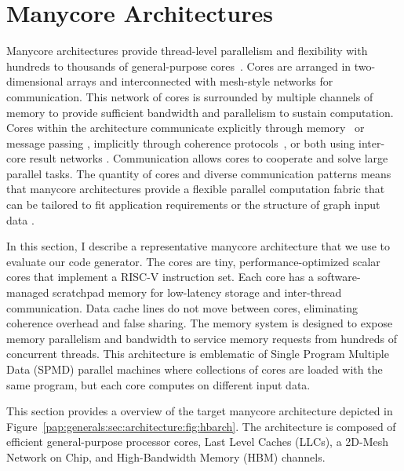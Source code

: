 
\section{Manycore Architectures} \label{pap:generals:sec:architecture}
Manycore architectures provide thread-level parallelism and flexibility with hundreds to thousands of general-purpose cores~\cite{ramey2011tilera, davidson2018celerity, gwennap2011adapteva, agathos2015parallela, taylor2004raw}.
Cores are arranged in two-dimensional arrays and interconnected with mesh-style networks for communication.
This network of cores is surrounded by multiple channels of memory to provide sufficient bandwidth and parallelism to sustain computation.
Cores within the architecture communicate explicitly through memory~\cite{davidson2018celerity} or message passing \cite{gwennap2011adapteva}, implicitly through coherence protocols~\cite{ramey2011tilera}, or both using inter-core result networks \cite{taylor2004raw}.
Communication allows cores to cooperate and solve large parallel tasks.
The quantity of cores and diverse communication patterns means that manycore architectures provide a flexible parallel computation fabric that can be tailored to fit application requirements or the structure of graph input data \cite{lumsdaine2007challenges}.

In this section, I describe a representative manycore architecture that we use to evaluate our code generator.
The cores are tiny, performance-optimized scalar cores that implement a RISC-V instruction set.
Each core has a software-managed scratchpad memory for low-latency storage and inter-thread communication.
Data cache lines do not move between cores, eliminating coherence overhead and false sharing.
The memory system is designed to expose memory parallelism and bandwidth to service memory requests from hundreds of concurrent threads.
This architecture is emblematic of Single Program Multiple Data (SPMD) parallel machines where collections of cores are loaded with the same program, but each core computes on different input data.

This section provides a overview of the target manycore
architecture depicted in
Figure~\ref{pap:generals:sec:architecture:fig:hbarch}. The
architecture is composed of efficient general-purpose processor cores,
Last Level Caches (LLCs), a 2D-Mesh Network on Chip, and High-Bandwidth
Memory (HBM) channels.

